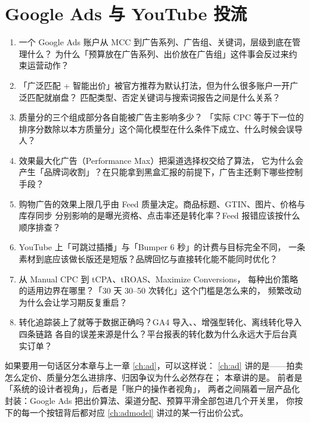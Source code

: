 \chapter{Google Ads 与 YouTube 投流}
\label{ch:google}

\begin{insight}[本章要解决的问题]
\begin{enumerate}
  \item 一个 Google Ads 账户从 MCC 到广告系列、广告组、关键词，层级到底在管理什么？
        为什么「预算放在广告系列、出价放在广告组」这件事会反过来约束运营动作？
  \item 「广泛匹配 + 智能出价」被官方推荐为默认打法，但为什么很多账户一开广泛匹配就崩盘？
        匹配类型、否定关键词与搜索词报告之间是什么关系？
  \item 质量分的三个组成部分各自能被广告主影响多少？
        「实际 CPC 等于下一位的排序分数除以本方质量分」这个简化模型在什么条件下成立、什么时候会误导人？
  \item 效果最大化广告（Performance Max）把渠道选择权交给了算法，
        它为什么会产生「品牌词收割」？在只能拿到黑盒汇报的前提下，广告主还剩下哪些控制手段？
  \item 购物广告的效果上限几乎由 Feed 质量决定。商品标题、GTIN、图片、价格与库存同步
        分别影响的是曝光资格、点击率还是转化率？Feed 报错应该按什么顺序排查？
  \item YouTube 上「可跳过插播」与「Bumper 6 秒」的计费与目标完全不同，
        一条素材到底应该做长版还是短版？品牌回忆与直接转化能不能同时优化？
  \item 从 Manual CPC 到 tCPA、tROAS、Maximize Conversions，
        每种出价策略的适用边界在哪里？「30 天 30--50 次转化」这个门槛是怎么来的，
        频繁改动为什么会让学习期反复重启？
  \item 转化追踪装上了就等于数据正确吗？GA4 导入、、增强型转化、离线转化导入四条链路
        各自的误差来源是什么？平台报表的转化数为什么永远大于后台真实订单？
\end{enumerate}
\end{insight}

如果要用一句话区分本章与上一章 \cref{ch:ad}，可以这样说：
\cref{ch:ad} 讲的是——拍卖怎么定价、质量分怎么进排序、归因争议为什么必然存在；
本章讲的是。
前者是「系统的设计者视角」，后者是「账户的操作者视角」，
两者之间隔着一层产品化封装：Google Ads 把出价算法、渠道分配、预算平滑全部包进几个开关里，
你按下的每一个按钮背后都对应 \cref{ch:admodel} 讲过的某一行出价公式。

